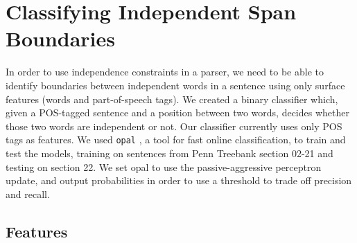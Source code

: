 \documentclass[11pt]{article}
\begin{document}
\section{Classifying Independent Span Boundaries}
\label{sec-4}

In order to use independence constraints in a parser, we need to be
able to identify boundaries between independent words in a sentence
using only surface features (words and part-of-speech tags). We
created a binary classifier which, given a POS-tagged sentence and a
position between two words, decides whether those two words are
independent or not. Our classifier currently uses only POS tags as
features. We used \texttt{opal} \cite{Yoshinaga2010}, a tool for fast online
classification, to train and test the models, training on sentences
from Penn Treebank section 02-21 and testing on section 22. We set
opal to use the passive-aggressive perceptron update, and output
probabilities in order to use a threshold to trade off precision and
recall.

\subsection{Features}
\label{sec-4-1}
\end{document}
